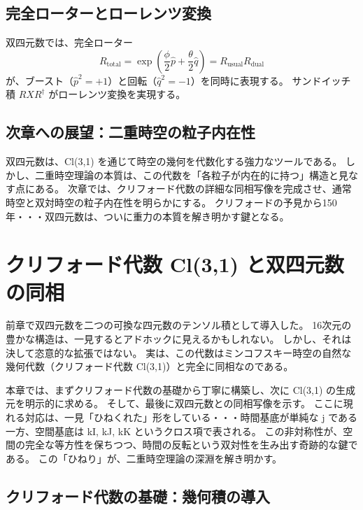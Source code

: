 \documentclass[dvipdfmx,a4paper]{jsbook}
\theoremstyle{definition}
\theoremstyle{remark}
\begin{document}
\section{完全ローターとローレンツ変換}
\label{sec:total-rotor}

双四元数では、完全ローター
\begin{equation}
  R_\text{total} = \exp\!\left( \frac{\phi}{2} \hat{p} + \frac{\theta}{2} \hat{q} \right)
  = R_\text{usual} R_\text{dual}
\end{equation}
が、ブースト（$\hat{p}^2 = +1$）と回転（$\hat{q}^2 = -1$）を同時に表現する。
サンドイッチ積 $R X R^\dagger$ がローレンツ変換を実現する。

\section{次章への展望：二重時空の粒子内在性}
\label{sec:to-double-spacetime}

双四元数は、Cl(3,1) を通じて時空の幾何を代数化する強力なツールである。
しかし、二重時空理論の本質は、この代数を「各粒子が内在的に持つ」構造と見なす点にある。
次章では、クリフォード代数の詳細な同相写像を完成させ、通常時空と双対時空の粒子内在性を明らかにする。
クリフォードの予見から150年・・・双四元数は、ついに重力の本質を解き明かす鍵となる。

\chapter{クリフォード代数 Cl(3,1) と双四元数の同相}
\label{chap:clifford-isomorphism}

前章で双四元数を二つの可換な四元数のテンソル積として導入した。
16次元の豊かな構造は、一見するとアドホックに見えるかもしれない。
しかし、それは決して恣意的な拡張ではない。
実は、この代数はミンコフスキー時空の自然な幾何代数（クリフォード代数 Cl(3,1)）と完全に同相なのである。

本章では、まずクリフォード代数の基礎から丁寧に構築し、次に Cl(3,1) の生成元を明示的に求める。
そして、最後に双四元数との同相写像を示す。
ここに現れる対応は、一見「ひねくれた」形をしている・・・時間基底が単純な j である一方、空間基底は kI, kJ, kK というクロス項で表される。
この非対称性が、空間の完全な等方性を保ちつつ、時間の反転という双対性を生み出す奇跡的な鍵である。
この「ひねり」が、二重時空理論の深淵を解き明かす。

\section{クリフォード代数の基礎：幾何積の導入}
\label{sec:clifford-basics}
\end{document}
